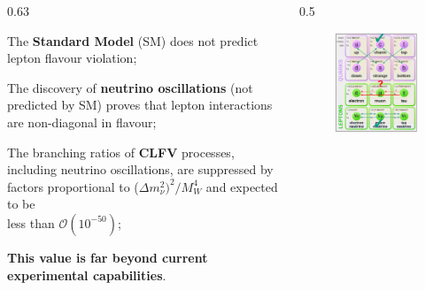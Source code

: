\documentclass{beamer}
\begin{document}
\begin{frame}
\begin{columns}
\begin{column}{0.63\framewidth}
        \begin{itemize}
     {\footnotesize     \item The \textbf{Standard Model} (SM) does not predict lepton flavour violation; \textcolor{white}{\cite{Bernstein_2013} \cite{Kargiantoulakis_2020} \cite{universe9010054}}
            \vspace{7mm}
            \item The discovery of \textbf{neutrino oscillations} (not predicted by SM) proves that lepton interactions are non-diagonal in flavour; 
            \vspace{7mm}
            \item The branching ratios of \textbf{CLFV}
            processes, including neutrino
            oscillations, are suppressed by factors
            proportional to ($\Delta m_\nu^2)^2 /M^4_W$ and expected to be \\ less than $\mathcal{O}(10^{-50})$;\textcolor{white}{\cite{clfv_signorelli} \cite{bartoszek2015mu2e} \cite{bobbb} \cite{kola}}
            \vspace{7mm}
            \item \textbf{This value is far beyond current experimental capabilities}.}  
        \end{itemize}
    \end{column}
    \begin{column}{0.5\framewidth}
        \begin{figure}[h]
            \centering
            \includegraphics[width=0.7\columnwidth]{figures/png/Screenshot_20240913_102556.png}
        \end{figure} 
        

\end{column}
\end{columns}
\end{frame}
\end{document}
